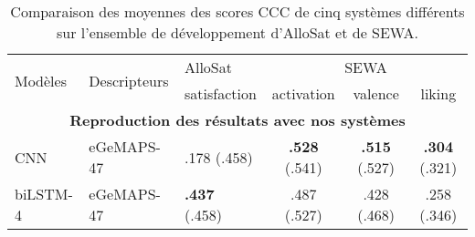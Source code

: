 \begin{table}[h]
  \centering
\begin{tabular}{|l|l|l|c|c|c|}
\hline
\multirow{2}{*}{Modèles} & \multirow{2}{*}{Descripteurs} & AlloSat                               & \multicolumn{3}{c|}{SEWA}                                                                                             \\ \cline{3-6}
                         &                               & satisfaction                          & activation                            & valence                               & liking                                \\ \hline
\multicolumn{6}{|c|}{\textbf{Reproduction des résultats avec nos systèmes}}                                                                                                                                              \\ \hline
CNN                      & eGeMAPS-47                    & .178 (.458)                           & \textbf{.528} (.541) & \textbf{.515} (.527) & \textbf{.304} (.321) \\
biLSTM-4                 & eGeMAPS-47                    & \textbf{.437} (.458) & .487 (.527)                           & .428 (.468)                           & .258 (.346)                           \\ \hline
\end{tabular}
\caption{Comparaison des moyennes des scores CCC de cinq systèmes différents sur l'ensemble de développement d'AlloSat et de SEWA.}
\label{tab:cnnVSbilstm}
\end{table}
